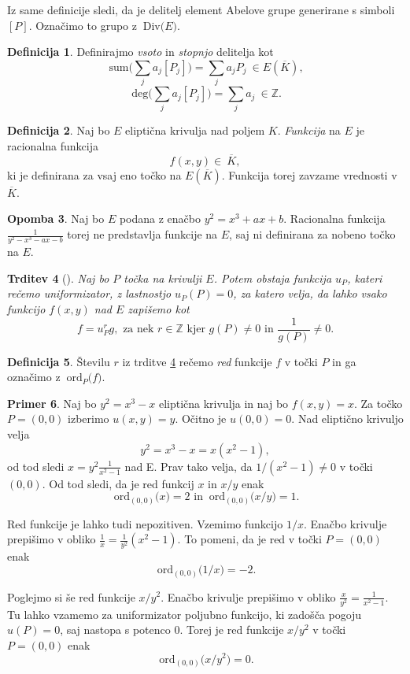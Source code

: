 \documentclass[12pt,a4paper,twoside]{article}
\theoremstyle{definition} %
\newtheorem{definicija}{Definicija}[section]
\newtheorem{primer}[definicija]{Primer}
\newtheorem{opomba}[definicija]{Opomba}
\theoremstyle{plain} %
\newtheorem{trditev}[definicija]{Trditev}
\numberwithin{equation}{section}  %
\newcommand{\Z}{\mathbb Z}
\newcommand{\E}[1]{E({#1})}
\newcommand{\DIV}[1]{\ \text{Div(}{#1}\text{)}}
\newcommand{\DEG}[1]{\ \text{deg(}{#1}\text{)}}
\newcommand{\SUM}[1]{\ \text{sum(}{#1}\text{)}}
\newcommand{\ORDp}[2]{\ \text{ord}_{#2}({#1}\text{)}}
\begin{document}
Iz same definicije sledi, da je delitelj element Abelove grupe generirane s simboli $[P]$. Označimo to grupo z $\DIV{E}$.


\begin{definicija}
Definirajmo \emph{vsoto} in \emph{stopnjo} delitelja kot
$$\SUM{\sum_{j}a_j[P_j]} = \sum_ja_jP_j \ \in \E{\overline{K}},$$
$$\DEG{\sum_{j}a_j[P_j]} = \sum_ja_j \ \in \Z.$$

\end{definicija}


\begin{definicija}
Naj bo $E$ eliptična krivulja nad poljem $K$. \emph{Funkcija} na $E$ je racionalna funkcija $$f(x,y) \in \ \overline{K},$$ ki je definirana za vsaj eno točko na $\E{\overline{K}}$. Funkcija torej zavzame vrednosti v $\overline{K}$.
\end{definicija}

\begin{opomba}
Naj bo $E$ podana z enačbo $y^2 = x^3+ax+b$. Racionalna funkcija $\frac{1}{y^2-x^3-ax-b}$ torej ne predstavlja funkcije na $E$, saj ni definirana za nobeno točko na $E$.

\end{opomba}

\begin{trditev}[]
\label{trd:red}
Naj bo $P$ točka na krivulji $E$. Potem obstaja funkcija $u_P$, kateri rečemo uniformizator, z lastnostjo $u_P(P) = 0$, za katero velja, da lahko vsako funkcijo $f(x,y)$ nad $E$ zapišemo kot
$$f = u^r_Pg, \text{ za nek } r\in \Z \text{ kjer } g(P) \neq 0 \text{ in } \frac{1}{g(P)} \neq 0.$$
\end{trditev}

\begin{definicija}
Številu $r$ iz trditve \ref{trd:red} rečemo \emph{red} funkcije $f$ v točki $P$ in ga označimo z $\ORDp{f}{P}$.
\end{definicija}

\begin{primer}
Naj bo $y^2 = x^3-x$ eliptična krivulja in naj bo $f(x,y) = x$. Za točko $P = (0,0)$ izberimo $u(x,y) = y$. Očitno je $u(0,0) = 0$. Nad eliptično krivuljo velja 
$$y^2 = x^3-x = x(x^2-1),$$ 
od tod sledi $x = y^2\frac{1}{x^2-1}$ nad E.
Prav tako velja, da $1/(x^2-1) \neq 0$ v točki $(0,0)$. Od tod sledi, da je red funkcij $x$ in $x/y$ enak
$$\ORDp{x}{(0,0)} = 2\text{ in }  \ORDp{x/y}{(0,0)}= 1.$$

Red funkcije je lahko tudi nepozitiven. Vzemimo funkcijo $1/x$. Enačbo krivulje prepišimo v obliko $\frac{1}{x} = \frac{1}{y^2}(x^2-1)$. To pomeni, da je red v točki $P=(0,0)$ enak
$$\ORDp{1/x}{(0,0)} = -2.$$

Poglejmo si še red funkcije $x/y^2$. Enačbo krivulje prepišimo v obliko $\frac{x}{y^2} = \frac{1}{x^2-1}$. Tu lahko vzamemo za uniformizator poljubno funkcijo, ki zadošča pogoju $u(P) = 0$, saj nastopa s potenco $0$. Torej je red funkcije $x/y^2$ v točki $P=(0,0)$ enak
$$\ORDp{x/y^2}{(0,0)} = 0.$$
\end{primer}
\end{document}
